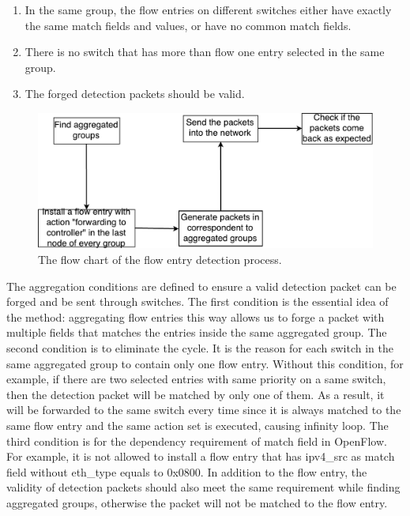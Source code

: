 \begin{enumerate}
\item
In the same group, the flow entries on different switches either have exactly the same match fields and values, or have no common match fields.
\item
There is no switch that has more than flow one entry selected in the same group. 
\item
The forged detection packets should be valid. 
\end{enumerate}

\begin{figure}[H]
\begin{center} 
\includegraphics[width=1\textwidth]{figures/flow_entry_detection_flowchart.pdf}
\end{center}
\caption{The flow chart of the flow entry detection process.}
\label{flow_entry_detection_flowchart}
\end{figure}

The aggregation conditions are defined to ensure a valid detection packet can be forged and be sent through switches. The first condition is the essential idea of the method: aggregating flow entries this way allows us to forge a packet with multiple fields that matches the entries inside the same aggregated group. The second condition is to eliminate the cycle. It is the reason for each switch in the same aggregated group to contain only one flow entry. Without this condition, for example, if there are two selected entries with same priority on a same switch, then the detection packet will be matched by only one of them. As a result, it will be forwarded to the same switch every time since it is always matched to the same flow entry and the same action set is executed, causing infinity loop. The third condition is for the dependency requirement of match field in OpenFlow. For example, it is not allowed to install a flow entry that has ipv4\_src as match field without eth\_type equals to 0x0800. In addition to the flow entry, the validity of detection packets should also meet the same requirement while finding aggregated groups, otherwise the packet will not be matched to the flow entry.

